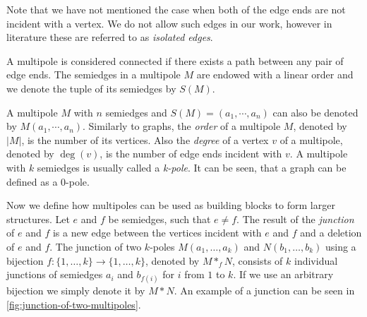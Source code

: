 \documentclass[12pt, twoside]{book}
\begin{document}
Note that we have not mentioned the case when both of the edge ends are not incident with a vertex. We do not allow such edges in our work, however in literature these are referred to as \textit{isolated edges}.

A multipole is considered connected if there exists a path between any pair of edge ends. The semiedges in a multipole $M$ are endowed with a linear order and we denote the tuple of its semiedges by $S(M)$.

A multipole $M$ with $n$ semiedges and $S(M) = (a_1, \cdots, a_n)$ can also be denoted by $M(a_1,\cdots,a_n)$. Similarly to graphs, the \textit{order} of a multipole $M$, denoted by $|M|$, is the number of its vertices. Also the \textit{degree} of a vertex $v$ of a multipole, denoted by $\deg(v)$, is the number of edge ends incident with $v$. A multipole with $k$ semiedges is usually called a \textit{k-pole}. It can be seen, that a graph can be defined as a 0-pole.

Now we define how multipoles can be used as building blocks to form larger structures. Let $e$ and $f$ be semiedges, such that $e\neq f$. The result of the \textit{junction} of $e$ and $f$ is a new edge between the vertices incident with $e$ and $f$ and a deletion of $e$ and $f$. The junction of two $k$-poles $M(a_1,\dots,a_k)$ and $N(b_1,\dots,b_k)$ using a bijection ${f:\{1,\dots,k\}\rightarrow\{1,\dots,k\}}$, denoted by $M*_fN$, consists of $k$ individual junctions of semiedges $a_i$ and $b_{f(i)}$ for $i$ from $1$ to $k$. If we use an arbitrary bijection we simply denote it by $M*N$. An example of a junction can be seen in \cref{fig:junction-of-two-multipoles}.
\end{document}
